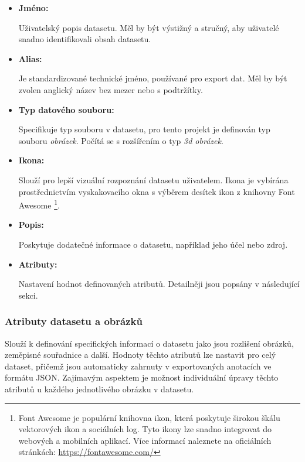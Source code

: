 \begin{itemize}
    \item \textbf{Jméno:}
    
    Uživatelský popis datasetu. Měl by být výstižný a stručný, aby uživatelé snadno identifikovali obsah datasetu.

    \item \textbf{Alias:}
    
    Je standardizované technické jméno, používané pro export dat. Měl by být zvolen anglický název bez mezer nebo s podtržítky.

    \item \textbf{Typ datového souboru:}
    
    Specifikuje typ souboru v datasetu, pro tento projekt je definován typ souboru \textit{obrázek}. Počítá se s rozšířením o typ \textit{3d obrázek}.

    \item \textbf{Ikona:}
    
    Slouží pro lepší vizuální rozpoznání datasetu uživatelem. Ikona je vybírána prostřednictvím vyskakovacího okna s výběrem desítek ikon z knihovny Font Awesome \footnote{Font Awesome je populární knihovna ikon, která poskytuje širokou škálu vektorových ikon a sociálních log. Tyto ikony lze snadno integrovat do webových a mobilních aplikací. Více informací naleznete na oficiálních stránkách: \url{https://fontawesome.com/}}.

    \item \textbf{Popis:}
    
    Poskytuje dodatečné informace o datasetu, například jeho účel nebo zdroj.

    \item \textbf{Atributy:}
    
    Nastavení hodnot definovaných atributů. Detailněji jsou popsány v následující sekci. 
\end{itemize}

\subsubsection{Atributy datasetu a obrázků}
Slouží k definování specifických informací o datasetu jako jsou rozlišení obrázků, zeměpisné souřadnice a další. Hodnoty těchto atributů lze nastavit pro celý dataset, přičemž jsou automaticky zahrnuty v exportovaných anotacích ve formátu JSON. Zajímavým aspektem je možnost individuální úpravy těchto atributů u každého jednotlivého obrázku v datasetu. 
    
